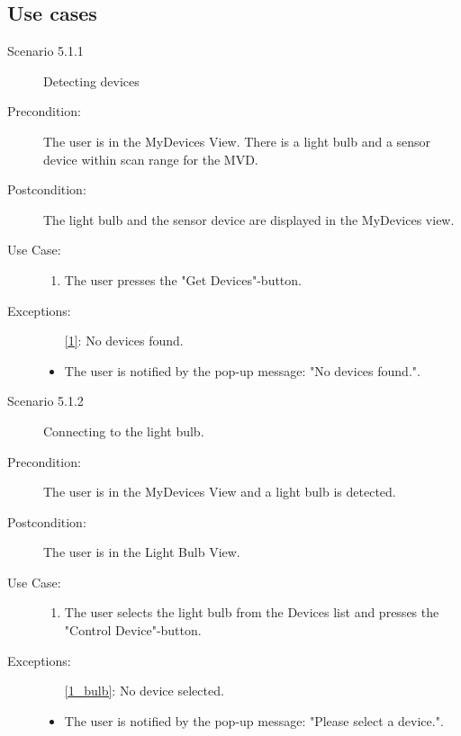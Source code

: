 \documentclass[a4paper]{article}
\begin{document}
\subsection{Use cases}
\begin{description}
\item[Scenario 5.1.1] Detecting devices
\item[Precondition:] The user is in the MyDevices View. There is a light bulb and a sensor device within scan range for the MVD.
\item[Postcondition:] The light bulb and the sensor device are displayed in the MyDevices view.
\item[Use Case:]\mbox{}
\begin{enumerate}
\item \label{1} The user presses the "Get Devices"-button.
\end{enumerate}

\item[Exceptions:]
\item[]
\begin{itemize}
\item [\ref{1}:] No devices found.
\item The user is notified by the pop-up message: "No devices found.".
\end{itemize}

\item[]

\item[Scenario 5.1.2] Connecting to the light bulb.
\item[Precondition:] The user is in the MyDevices View and a light bulb is detected.
\item[Postcondition:] The user is in the Light Bulb View.
\item[Use Case:]\mbox{}
\begin{enumerate}
\item \label{1_bulb} The user selects the light bulb from the Devices list and presses the "Control Device"-button.
\end{enumerate}

\item[Exceptions:]
\item[]
\begin{itemize}
\item [\ref{1_bulb}:] No device selected.
\item The user is notified by the pop-up message: "Please select a device.".
\end{itemize}



\end{description}
\end{document}
